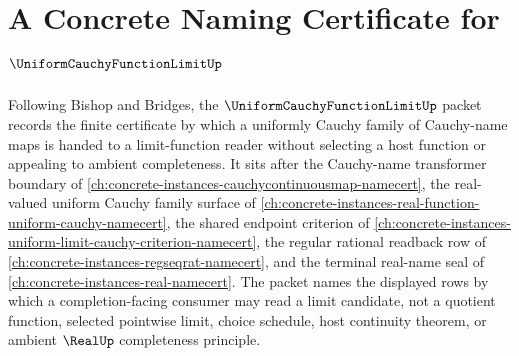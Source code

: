\chapter{A Concrete Naming Certificate for $\UniformCauchyFunctionLimitUp$}
\label{ch:concrete-instances-uniform-cauchy-function-limit-namecert}

Following Bishop and Bridges, the $\UniformCauchyFunctionLimitUp$ packet records the finite certificate by which a uniformly Cauchy family of Cauchy-name maps is handed to a limit-function reader without selecting a host function or appealing to ambient completeness. It sits after the Cauchy-name transformer boundary of \autoref{ch:concrete-instances-cauchycontinuousmap-namecert}, the real-valued uniform Cauchy family surface of \autoref{ch:concrete-instances-real-function-uniform-cauchy-namecert}, the shared endpoint criterion of \autoref{ch:concrete-instances-uniform-limit-cauchy-criterion-namecert}, the regular rational readback row of \autoref{ch:concrete-instances-regseqrat-namecert}, and the terminal real-name seal of \autoref{ch:concrete-instances-real-namecert}. The packet names the displayed rows by which a completion-facing consumer may read a limit candidate, not a quotient function, selected pointwise limit, choice schedule, host continuity theorem, or ambient $\RealUp$ completeness principle.

